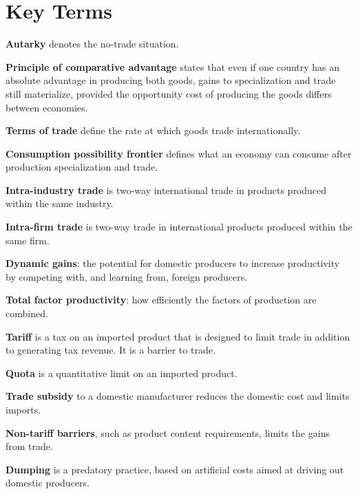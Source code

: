 \newpage
	\section*{Key Terms}
\begin{keyterms}
\textbf{Autarky} denotes the no-trade situation.

\textbf{Principle of comparative advantage} states that even if one country has an absolute advantage in producing both goods, gains to specialization and trade still materialize, provided the opportunity cost of producing the goods differs between economies.

\textbf{Terms of trade} define the rate at which goods trade internationally.

\textbf{Consumption possibility frontier} defines what an economy can consume after production specialization and trade.

\textbf{Intra-industry trade} is two-way international trade in products produced within the same industry.

\textbf{Intra-firm trade} is two-way trade in international products produced within the same firm.

\textbf{Dynamic gains}: the potential for domestic producers to increase productivity by competing with, and learning from, foreign producers.

\textbf{Total factor productivity}: how efficiently the factors of production are combined.

\textbf{Tariff} is a tax on an imported product that is designed to limit trade in addition to generating tax revenue. It is a barrier to trade.

\textbf{Quota} is a quantitative limit on an imported product.

\textbf{Trade subsidy} to a domestic manufacturer reduces the domestic cost and limits imports.

\textbf{Non-tariff barriers}, such as product content requirements, limits the gains from trade.

\textbf{Dumping} is a predatory practice, based on artificial costs aimed at driving out domestic producers.
\end{keyterms}